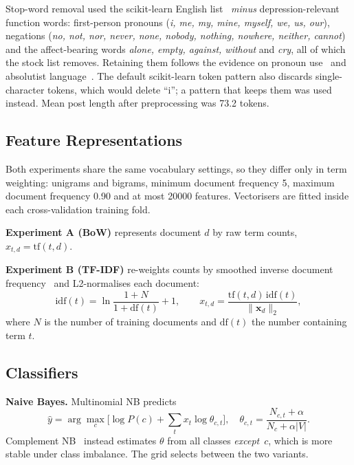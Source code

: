 \documentclass[conference]{IEEEtran}
\begin{document}
Stop-word removal used the scikit-learn English list~\cite{pedregosa2011sklearn} \emph{minus} depression-relevant function words: first-person pronouns (\textit{i, me, my, mine, myself, we, us, our}), negations (\textit{no, not, nor, never, none, nobody, nothing, nowhere, neither, cannot}) and the affect-bearing words \textit{alone, empty, against, without} and \textit{cry}, all of which the stock list removes. Retaining them follows the evidence on pronoun use~\cite{rude2004language} and absolutist language~\cite{almosaiwi2018absolute}. The default scikit-learn token pattern also discards single-character tokens, which would delete ``i''; a pattern that keeps them was used instead. Mean post length after preprocessing was 73.2 tokens.

\subsection{Feature Representations}

Both experiments share the same vocabulary settings, so they differ only in term weighting: unigrams and bigrams, minimum document frequency 5, maximum document frequency 0.90 and at most \num{20000} features. Vectorisers are fitted inside each cross-validation training fold.

\textbf{Experiment A (BoW)} represents document $d$ by raw term counts, $x_{t,d}=\mathrm{tf}(t,d)$.

\textbf{Experiment B (TF-IDF)} re-weights counts by smoothed inverse document frequency~\cite{salton1988term} and L2-normalises each document:
\begin{equation}
\mathrm{idf}(t)=\ln\frac{1+N}{1+\mathrm{df}(t)}+1,\qquad
x_{t,d}=\frac{\mathrm{tf}(t,d)\,\mathrm{idf}(t)}{\lVert \mathbf{x}_d\rVert_2},
\end{equation}
where $N$ is the number of training documents and $\mathrm{df}(t)$ the number containing term $t$.

\subsection{Classifiers}

\textbf{Naive Bayes.} Multinomial NB predicts
\begin{equation}
\hat{y}=\arg\max_c\Big[\log P(c)+\sum_t x_{t}\log\theta_{c,t}\Big],\quad
\theta_{c,t}=\frac{N_{c,t}+\alpha}{N_c+\alpha|V|}.
\end{equation}
Complement NB~\cite{rennie2003tackling} instead estimates $\theta$ from all classes \emph{except}~$c$, which is more stable under class imbalance. The grid selects between the two variants.
\end{document}
